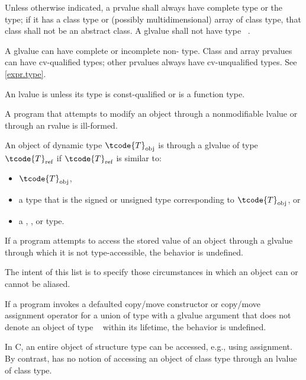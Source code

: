 \pnum
Unless otherwise indicated,
a prvalue shall always have complete type or the  type;
if it has a class type or (possibly multidimensional) array of class type,
that class shall not be an abstract class.
A glvalue shall not have type \cv{}~.
\begin{note}
A glvalue can have complete or incomplete non- type.
Class and array prvalues can have cv-qualified types; other prvalues
always have cv-unqualified types. See \ref{expr.type}.
\end{note}

\pnum
An lvalue is  unless its type is const-qualified
or is a function type.
\begin{note}
A program that attempts
to modify an object through a nonmodifiable lvalue or through an rvalue
is ill-formed.
\end{note}

\pnum
An object of dynamic type $\tcode{T}_\text{obj}$ is
 through a glvalue of type $\tcode{T}_\text{ref}$
if $\tcode{T}_\text{ref}$ is similar to:
\begin{itemize}
\item $\tcode{T}_\text{obj}$,

\item a type that is the signed or unsigned type corresponding to $\tcode{T}_\text{obj}$, or

\item a , , or  type.
\end{itemize}
If a program attempts to access
the stored value of an object through a glvalue
through which it is not type-accessible,
the behavior is undefined.
\begin{footnote}
The intent of this list is to specify those circumstances in which an
object can or cannot be aliased.
\end{footnote}
If a program invokes
a defaulted copy/move constructor or copy/move assignment operator
for a union of type  with a glvalue argument
that does not denote an object of type \cv{}~ within its lifetime,
the behavior is undefined.
\begin{note}
In C, an entire object of structure type can be accessed, e.g., using assignment.
By contrast, \Cpp{} has no notion of accessing an object of class type
through an lvalue of class type.
\end{note}

